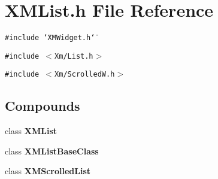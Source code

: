 \section{XMList.h File Reference}
\label{XMList_8h}
{\tt \#include \char`\"{}XMWidget.h\char`\"{}}\par
{\tt \#include $<$Xm/List.h$>$}\par
{\tt \#include $<$Xm/Scrolled\-W.h$>$}\par
\subsection*{Compounds}
\begin{CompactItemize}
\item 
class {\bf XMList}
\item 
class {\bf XMList\-Base\-Class}
\item 
class {\bf XMScrolled\-List}
\end{CompactItemize}
